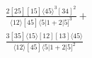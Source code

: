 \documentclass[varwidth, border=5pt]{standalone}
\begin{document}
\begin{my}
$\begin{gathered}
\scriptscriptstyle\frac{2[25][15]⟨45⟩^3[34]^2}{⟨12⟩[45]⟨5|1+2|5]^3}+\\
\scriptscriptstyle\frac{3[35]⟨15⟩[12][13]⟨45⟩}{⟨12⟩[45]⟨5|1+2|5]^2}\phantom{+}
\end{gathered}$
\end{my}
\end{document}

